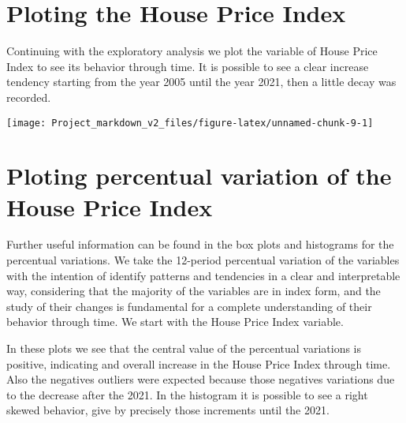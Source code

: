\documentclass[
]{article}
\begin{document}
\section{Ploting the House Price
Index}\label{ploting-the-house-price-index}

Continuing with the exploratory analysis we plot the variable of House
Price Index to see its behavior through time. It is possible to see a
clear increase tendency starting from the year 2005 until the year 2021,
then a little decay was recorded.

\begin{center}\texttt{[image: Project\_markdown\_v2\_files/figure-latex/unnamed-chunk-9-1]} \end{center}

\section{Ploting percentual variation of the House Price
Index}\label{ploting-percentual-variation-of-the-house-price-index}

Further useful information can be found in the box plots and histograms
for the percentual variations. We take the 12-period percentual
variation of the variables with the intention of identify patterns and
tendencies in a clear and interpretable way, considering that the
majority of the variables are in index form, and the study of their
changes is fundamental for a complete understanding of their behavior
through time. We start with the House Price Index variable.

In these plots we see that the central value of the percentual
variations is positive, indicating and overall increase in the House
Price Index through time. Also the negatives outliers were expected
because those negatives variations due to the decrease after the 2021.
In the histogram it is possible to see a right skewed behavior, give by
precisely those increments until the 2021.
\end{document}
